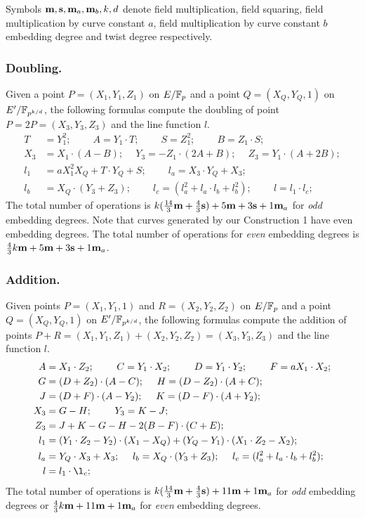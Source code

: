 Symbols $\textbf{m}, \textbf{s}, \textbf{m}_{a}, \textbf{m}_{b}, k, d$ denote
field multiplication,
field squaring,
field multiplication by curve constant $a$,
field multiplication by curve constant $b$
embedding degree and
twist degree respectively.

\subsubsection{Doubling.}
Given a point $P = (X_1,Y_1,Z_1)$ on $E/\mathbb{F}_{p}$ and a point $Q = (X_Q,Y_Q,1)$ on $E'/\mathbb{F}_{p^{k/d}}$,
the following formulas compute the doubling of point $P = 2P = (X_3,Y_3,Z_3)$ and the line function $l$.
\begin{align*}
T &= Y_1^2;\	\qquad	A = Y_1 \cdot T;\	\qquad
S = Z_1 ^ 2;\	\qquad	B = Z_1 \cdot S;\\
X_3 &= X_1 \cdot (A - B);\	\quad
Y_3 = -Z_1 \cdot (2A + B);\	\quad
Z_3 = Y_1 \cdot (A + 2B);\\
l_1 &= a X_1^2 X_Q + T \cdot Y_Q + S;\	\qquad
l_a = X_3 \cdot Y_Q + X_3;	\\
l_b &= X_Q \cdot (Y_3 + Z_3);\			\qquad
l_c = (l_a^2 + l_a \cdot l_b + l_b^2);\		\qquad
l = l_1 \cdot l_c;
\end{align*}
The total number of operations is
$ k(\frac{14}{3}\textbf{m} + \frac{4}{3}\textbf{s}) + 5\textbf{m} +3\textbf{s} + 1\textbf{m}_a$ for {\it{odd}} embedding degrees.
Note that curves generated by our Construction 1 have even embedding degrees.
The total number of operations for {\it{even}} embedding degrees is
$ \frac{4}{3}k\textbf{m} + 5\textbf{m} +3\textbf{s} + 1\textbf{m}_a$.

\subsubsection{Addition.}
Given points $P = (X_1,Y_1,1)$ and $R = (X_2,Y_2,Z_2)$ on $E/\mathbb{F}_{p}$ and a point $Q = (X_Q,Y_Q,1)$ on $E'/\mathbb{F}_{p^{k/d}}$,
the following formulas compute the addition of points $P + R = (X_1,Y_1,Z_1) + (X_2,Y_2,Z_2) = (X_3,Y_3,Z_3)$ and the line function $l$.
\begin{align*}
A &= X_1 \cdot Z_2;\	\qquad
C = Y_1 \cdot X_2;\	\qquad
D = Y_1 \cdot Y_2;\	\qquad
F = a X_1 \cdot X_2;\\
G &= (D + Z_2) \cdot (A - C);\	\quad
H = (D - Z_2) \cdot (A + C);\\
J &= (D + F) \cdot (A - Y_2);\	\quad
K = (D - F) \cdot (A + Y_2);\\
X_3 &= G - H;\	\qquad
Y_3 = K - J;\\
Z_3 &= J + K - G - H - 2(B - F) \cdot (C + E);\\
l_1 &= (Y_1 \cdot Z_2 - Y_2) \cdot (X_1 - X_Q) + (Y_Q - Y_1) \cdot (X_1 \cdot Z_2 - X_2);\\
l_a &= Y_Q \cdot X_3 + X_3;\	\quad
l_b = X_Q \cdot (Y_3 + Z_3);\	\quad
l_c = (l_a^2 + l_a \cdot l_b + l_b^2);\\
l &= l_1 \cdot \l_c;
\end{align*}
The total number of operations is
$ k(\frac{14}{3}\textbf{m} + \frac{4}{3}\textbf{s}) + 11\textbf{m} + 1\textbf{m}_a$ for {\it{odd}} embedding degrees or
$ \frac{4}{3}k\textbf{m} + 11\textbf{m} + 1\textbf{m}_a$ for {\it{even}} embedding degrees.


